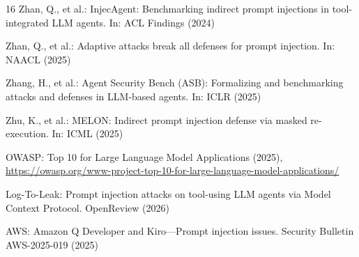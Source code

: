 \documentclass[runningheads]{llncs}
\begin{document}
\begin{thebibliography}{16}
Zhan, Q., et al.: InjecAgent: Benchmarking indirect prompt injections in tool-integrated LLM agents. In: ACL Findings (2024)

Zhan, Q., et al.: Adaptive attacks break all defenses for prompt injection. In: NAACL (2025)

Zhang, H., et al.: Agent Security Bench (ASB): Formalizing and benchmarking attacks and defenses in LLM-based agents. In: ICLR (2025)

Zhu, K., et al.: MELON: Indirect prompt injection defense via masked re-execution. In: ICML (2025)

OWASP: Top 10 for Large Language Model Applications (2025), \url{https://owasp.org/www-project-top-10-for-large-language-model-applications/}

Log-To-Leak: Prompt injection attacks on tool-using LLM agents via Model Context Protocol. OpenReview (2026)

AWS: Amazon Q Developer and Kiro---Prompt injection issues. Security Bulletin AWS-2025-019 (2025)

\end{thebibliography}
\end{document}
